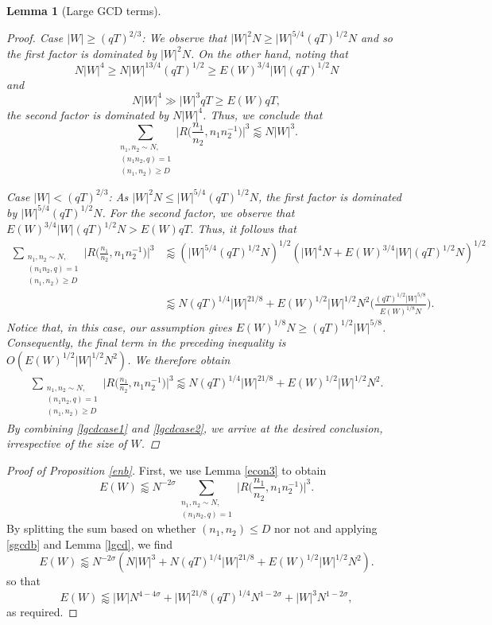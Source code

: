 \documentclass[12pt]{amsart}
\newtheorem{lemma}[theorem]{Lemma}
\theoremstyle{definition}
\theoremstyle{plain}
\theoremstyle{remark}
\numberwithin{equation}{section}
\numberwithin{theorem}{section}
\numberwithin{equation}{section}
\begin{document}
\begin{lemma}[Large GCD terms]
\begin{proof}
			Case $|W| \geq (qT)^{2/3}$: We observe that $|W|^{2}N \geq|W|^{5/4}(qT)^{1/2}N$ and so the first factor is dominated by $|W|^{2}N$. On the other hand, noting that
			\[N|W|^{4} \geq N|W|^{13/4}(qT)^{1/2} \geq E(W)^{3/4}|W|(qT)^{1/2}N\]
			and 
			\[N|W|^{4} \gg |W|^{3}qT \geq E(W)qT,\]
			the second factor is dominated by $N|W|^{4}$. Thus, we conclude that 
			\begin{equation}\label{lgcdcase1}
				\sum_{\substack{n_{1}, n_{2} \sim N, \\ (n_{1}n_{2}, q)=1 \\ (n_{1}, n_{2})\geq D}}\bigg|R\bigg(\frac{n_{1}}{n_{2}}, n_{1}n_{2}^{-1}\bigg)\bigg|^{3}
				\lessapprox N|W|^{3}.
			\end{equation}
			
			Case $|W| < (qT)^{2/3}$: As $|W|^{2}N \leq |W|^{5/4}(qT)^{1/2}N$, the first factor is dominated by $|W|^{5/4}(qT)^{1/2}N$. For the second factor, we observe that $E(W)^{3/4}|W|(qT)^{1/2}N > E(W)qT$. Thus, it follows that 
			\begin{align*}
				\sum_{\substack{n_{1}, n_{2} \sim N, \\ (n_{1}n_{2}, q)=1 \\ (n_{1}, n_{2})\geq D}}\bigg|R\bigg(\frac{n_{1}}{n_{2}}, n_{1}n_{2}^{-1}\bigg)\bigg|^{3}
				&\lessapprox
				(|W|^{5/4}(qT)^{1/2}N)^{1/2}
				(|W|^{4}N+E(W)^{3/4}|W|(qT)^{1/2}N)^{1/2}
				\\
				&\lessapprox
				N(qT)^{1/4}|W|^{21/8}+E(W)^{1/2}|W|^{1/2}N^{2}\bigg(\frac{(qT)^{1/2}|W|^{5/8}}{E(W)^{1/8}N}\bigg).
			\end{align*}
			Notice that, in this case, our assumption gives
			$E(W)^{1/8}N \geq (qT)^{1/2}|W|^{5/8}$. Consequently, the final term in the
			preceding inequality is
			$O(E(W)^{1/2}|W|^{1/2}N^2)$. We therefore obtain
			\begin{align}\label{lgcdcase2}
				\sum_{\substack{n_{1}, n_{2} \sim N, \\ (n_{1}n_{2}, q)=1 \\ (n_{1}, n_{2})\geq D}}\bigg|R\bigg(\frac{n_{1}}{n_{2}}, n_{1}n_{2}^{-1}\bigg)\bigg|^{3}
				\lessapprox
				N(qT)^{1/4}|W|^{21/8}+E(W)^{1/2}|W|^{1/2}N^{2}.
			\end{align}
			By combining \eqref{lgcdcase1} and \eqref{lgcdcase2}, we arrive at the desired conclusion, irrespective of the size of \(W\).
		\end{proof}
	\end{lemma}
	
	\begin{proof}[Proof of Proposition \ref{enb}]\label{profmainPro}
		First, we use Lemma \ref{econ3} to obtain
		\[E(W)\lessapprox N^{-2\sigma}\sum_{\substack{n_1,n_2 \sim N, \\ (n_1n_2, q)=1}}\bigg|R\bigg(\frac{n_{1}}{n_{2}}, n_{1}n_{2}^{-1}\bigg)\bigg|^{3}.\]
		By splitting the sum based on whether $(n_{1}, n_{2})\leq D$ nor not and applying \eqref{sgcdb} and Lemma \ref{lgcd}, we find
		\[E(W)\lessapprox N^{-2\sigma}(N|W|^{3}+N(qT)^{1/4}|W|^{21/8}+E(W)^{1/2}|W|^{1/2}N^{2}).\]
		so that
		\[ E(W) \lessapprox |W|N^{4-4\sigma}+|W|^{21/8}(qT)^{1/4}N^{1-2\sigma}+|W|^{3}N^{1-2\sigma},
		\]
		as required.
	\end{proof}
	
\end{document}
